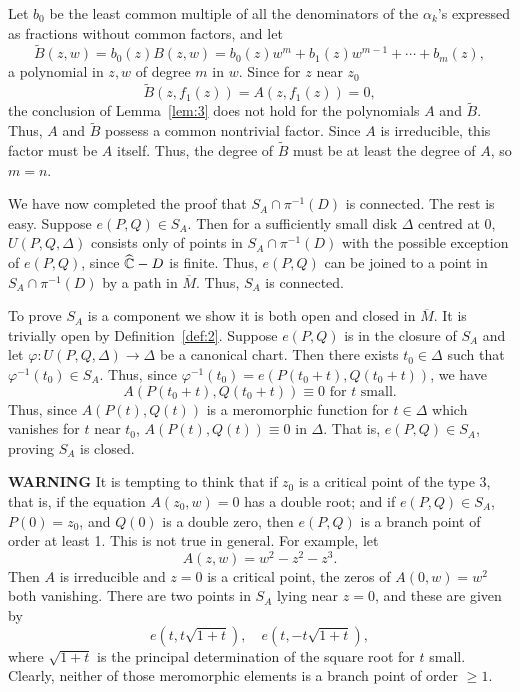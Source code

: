 \documentclass[a4paper,11pt]{article}
\begin{document}
\begin{myproof}
  Let $b_0$ be the least common multiple of all the denominators of
  the $\alpha_k$'s expressed as fractions without common factors, and
  let
  $$
  \widetilde{B}(z,w) = b_0(z)B(z,w) = b_0(z)w^m + b_1(z)w^{m-1} +
  \cdots + b_m(z),
  $$
  a polynomial in $z,w$ of degree $m$ in $w$.  Since for $z$ near
  $z_0$
  $$
  \widetilde{B}(z,f_1(z)) = A(z,f_1(z)) = 0,
  $$
  the conclusion of Lemma~\ref{lem:3} does not hold for the
  polynomials $A$ and $\widetilde{B}$.  Thus, $A$ and $\widetilde{B}$
  possess a common nontrivial factor.  Since $A$ is irreducible, this
  factor must be $A$ itself.  Thus, the degree of $\widetilde{B}$ must
  be at least the degree of $A$, so $m=n$.

  We have now completed the proof that $S_A \cap \pi^{-1}(D)$ is
  connected.  The rest is easy.  Suppose $e(P,Q) \in S_A$.  Then for a
  sufficiently small disk $\Delta$ centred at 0, $U(P,Q,\Delta)$
  consists only of points in $S_A \cap \pi^{-1}(D)$ with the possible
  exception of $e(P,Q)$, since $\widehat{{\mathbb C}}-D$ is finite.  Thus,
  $e(P, Q)$ can be joined to a point in $S_A \cap \pi^{-1}(D)$ by a
  path in $\overline{M}$.  Thus, $S_A$ is connected.

  To prove $S_A$ is a component we show it is both open and closed in
  $\overline{M}$.  It is trivially open by Definition~\ref{def:2}.
  Suppose $e(P,Q)$ is in the closure of $S_A$ and let $\varphi :
  U(P,Q,\Delta) \to \Delta$ be a canonical chart.  Then there exists
  $t_0 \in \Delta$ such that $\varphi^{-1}(t_0) \in S_A$.  Thus, since
  $\varphi^{-1}(t_0) = e(P(t_0 + t), Q(t_0 + t))$, we have
  $$
  A(P(t_0 + t), Q(t_0 + t)) \equiv 0\text{ for }t\text{ small}.
  $$
  Thus, since $A(P(t), Q(t))$ is a meromorphic function for $t \in
  \Delta$ which vanishes for $t$ near $t_0$, $A(P(t), Q(t)) \equiv 0$
  in $\Delta$.  That is, $e(P,Q) \in S_A$, proving $S_A$ is closed.
\end{myproof}

\textbf{WARNING} It is tempting to think that if $z_0$ is a critical
point of the type 3, that is, if the equation $A(z_0, w) = 0$ has a
double root; and if $e(P,Q) \in S_A$, $P(0) = z_0$, and $Q(0)$ is a
double zero, then $e(P,Q)$ is a branch point of order at least 1.
This is not true in general.  For example, let
$$
A(z,w) = w^2 - z^2 - z^3.
$$
Then $A$ is irreducible and $z=0$ is a critical point, the zeros of
$A(0, w) = w^2$ both vanishing.  There are two points in $S_A$ lying
near $z=0$, and these are given by
$$
e(t, t\sqrt{1+t}), \quad e(t, -t\sqrt{1+t}),
$$
where $\sqrt{1+t}$ is the principal determination of the square root
for $t$ small.  Clearly, neither of those meromorphic elements is a
branch point of order $\ge 1$.
\end{document}
